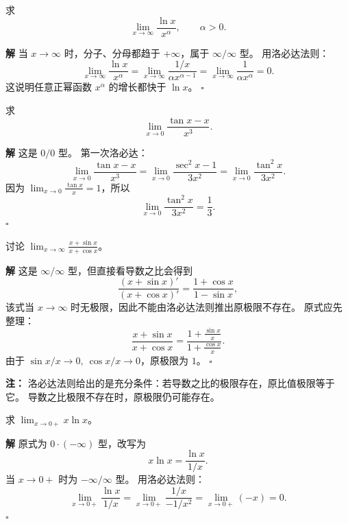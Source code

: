 \documentclass[fontset=fandol]{ctexart}
\newenvironment{solution}{\par\noindent\textbf{解}\quad}{\hfill$\square$\par\vspace{0.8em}}
\newenvironment{warning}{\par\noindent\textbf{注：}\quad}{\par\vspace{0.8em}}
\begin{document}
\begin{example}
求
\[
\lim_{x\to\infty}\frac{\ln x}{x^\alpha},\qquad \alpha>0.
\]
\end{example}
\begin{solution}
当 $x\to\infty$ 时，分子、分母都趋于 $+\infty$，属于 $\infty/\infty$ 型。 用洛必达法则：
\[
\lim_{x\to\infty}\frac{\ln x}{x^\alpha}
=\lim_{x\to\infty}\frac{1/x}{\alpha x^{\alpha-1}}
=\lim_{x\to\infty}\frac{1}{\alpha x^\alpha}=0.
\]
这说明任意正幂函数 $x^\alpha$ 的增长都快于 $\ln x$。
\end{solution}

\begin{example}[三角函数高阶小量]
求
\[
\lim_{x\to0}\frac{\tan x-x}{x^3}.
\]
\end{example}
\begin{solution}
这是 $0/0$ 型。 第一次洛必达：
\[
\lim_{x\to0}\frac{\tan x-x}{x^3}
=\lim_{x\to0}\frac{\sec^2x-1}{3x^2}
=\lim_{x\to0}\frac{\tan^2x}{3x^2}.
\]
因为 $\lim_{x\to0}\frac{\tan x}{x}=1$，所以
\[
\lim_{x\to0}\frac{\tan^2x}{3x^2}
=\frac13.
\]
\end{solution}

\begin{example}[不能机械使用洛必达法则]
讨论 $\displaystyle\lim_{x\to\infty}\frac{x+\sin x}{x+\cos x}$。
\end{example}
\begin{solution}
这是 $\infty/\infty$ 型，但直接看导数之比会得到
\[
\frac{(x+\sin x)'}{(x+\cos x)'}=\frac{1+\cos x}{1-\sin x},
\]
该式当 $x\to\infty$ 时无极限，因此不能由洛必达法则推出原极限不存在。 原式应先整理：
\[
\frac{x+\sin x}{x+\cos x}
=\frac{1+\frac{\sin x}{x}}{1+\frac{\cos x}{x}}.
\]
由于 $\sin x/x\to0,\ \cos x/x\to0$，原极限为 $1$。
\end{solution}
\begin{warning}
洛必达法则给出的是充分条件：若导数之比的极限存在，原比值极限等于它。 导数之比极限不存在时，原极限仍可能存在。
\end{warning}

\begin{example}[转化未定式]
求 $\displaystyle\lim_{x\to0+}x\ln x$。
\end{example}
\begin{solution}
原式为 $0\cdot(-\infty)$ 型，改写为
\[
x\ln x=\frac{\ln x}{1/x}.
\]
当 $x\to0+$ 时为 $-\infty/\infty$ 型。 用洛必达法则：
\[
\lim_{x\to0+}\frac{\ln x}{1/x}
=\lim_{x\to0+}\frac{1/x}{-1/x^2}
=\lim_{x\to0+}(-x)=0.
\]
\end{solution}
\end{document}
